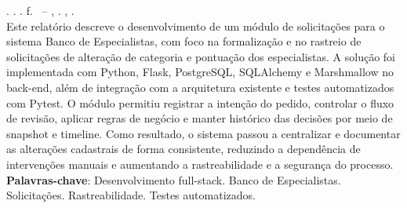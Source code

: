 
\begin{resumo}[RESUMO]
\begin{SingleSpacing}

\imprimirautorcitacao. \imprimirtitulo. \imprimirdata. \pageref {LastPage} f. \imprimirprojeto\ – \imprimirprograma, \imprimirinstituicao. \imprimirlocal, \imprimirdata.\\

Este relatório descreve o desenvolvimento de um módulo de solicitações para o sistema Banco de Especialistas, com foco na formalização e no rastreio de solicitações de alteração de categoria e pontuação dos especialistas. A solução foi implementada com Python, Flask, PostgreSQL, SQLAlchemy e Marshmallow no back-end, além de integração com a arquitetura existente e testes automatizados com Pytest. O módulo permitiu registrar a intenção do pedido, controlar o fluxo de revisão, aplicar regras de negócio e manter histórico das decisões por meio de snapshot e timeline. Como resultado, o sistema passou a centralizar e documentar as alterações cadastrais de forma consistente, reduzindo a dependência de intervenções manuais e aumentando a rastreabilidade e a segurança do processo.\\

\textbf{Palavras-chave}: Desenvolvimento full-stack. Banco de Especialistas. Solicitações. Rastreabilidade. Testes automatizados.

\end{SingleSpacing}
\end{resumo}


